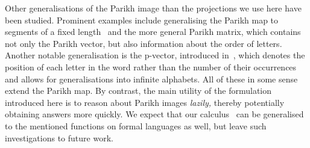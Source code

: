 Other generalisations of the Parikh image than the projections we use here
have been studied. Prominent examples include generalising the Parikh map to
segments of a fixed length~\cite{KARHUMAKI1980155} and the more general Parikh
matrix, which contains not only the Parikh vector, but also information about
the order of letters. Another notable generalisation is the p-vector, introduced
in~\cite{infinite-words}, which denotes the position of each letter in the word
rather than the number of their occurrences and allows for generalisations into
infinite alphabets. All of these in some sense extend the Parikh map. By
contrast, the main utility of the formulation introduced here is to reason
about Parikh images \emph{lazily,}
thereby potentially obtaining answers more quickly. We expect that our
calculus~\Calculus{} can be generalised to the mentioned functions on
formal languages as well, but leave such investigations to future work.


